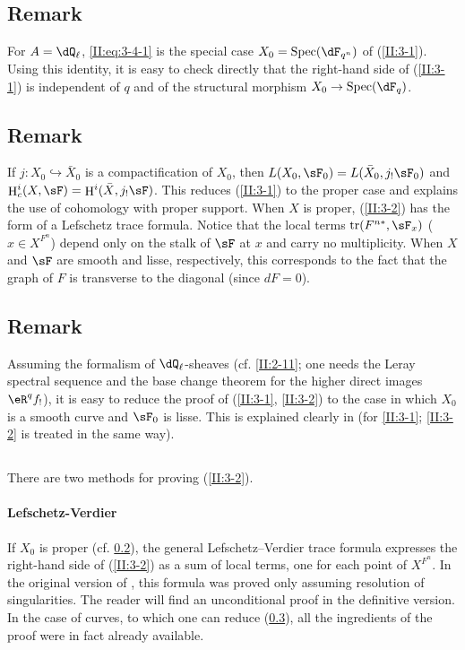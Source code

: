 \documentclass[12pt,oneside,english]{smfbook}
\DeclareMathOperator{\h}{H}
\DeclareMathOperator{\spec}{Spec}
\DeclareMathOperator{\tr}{tr}
\begin{document}
\subsection{Remark}\label{II:3-5}

For $A=\dQ_\ell$, \eqref{II:eq:3-4-1} is the special case $X_0=\spec(\dF_{q^n})$ of (\ref{II:3-1}). Using this identity, it is easy to check directly that the right-hand side of (\ref{II:3-1}) is independent of $q$ and of the structural morphism $X_0\to\spec(\dF_q)$.

\subsection{Remark}\label{II:3-6}

If $j:X_0\hookrightarrow\bar X_0$ is a compactification of $X_0$, then $L(X_0,\sF_0)=L(\bar X_0,j_!\sF_0)$ and $\h_c^i(X,\sF)=\h^i(\bar X,j_!\sF)$. This reduces (\ref{II:3-1}) to the proper case and explains the use of cohomology with proper support. When $X$ is proper, (\ref{II:3-2}) has the form of a Lefschetz trace formula. Notice that the local terms $\tr(F^{n*},\sF_x)$ ($x\in X^{F^n}$) depend only on the stalk of $\sF$ at $x$ and carry no multiplicity. When $X$ and $\sF$ are smooth and lisse, respectively, this corresponds to the fact that the graph of $F$ is transverse to the diagonal (since $dF=0$).

\subsection{Remark}\label{II:3-7}

Assuming the formalism of $\dQ_\ell$-sheaves (cf. \ref{II:2-11}; one needs the Leray spectral sequence and the base change theorem for the higher direct images $\eR^qf_!$), it is easy to reduce the proof of (\ref{II:3-1}, \ref{II:3-2}) to the case in which $X_0$ is a smooth curve and $\sF_0$ is lisse. This is explained clearly in \cite[\S 5]{gr95} (for \ref{II:3-1}; \ref{II:3-2} is treated in the same way).

\subsection{}\label{II:3-8}

There are two methods for proving (\ref{II:3-2}).

\paragraph{Lefschetz-Verdier}
If $X_0$ is proper (cf. \ref{II:3-6}), the general Lefschetz--Verdier trace formula expresses the right-hand side of (\ref{II:3-2}) as a sum of local terms, one for each point of $X^{F^n}$. In the original version of \cite{sga5}, this formula was proved only assuming resolution of singularities. The reader will find an unconditional proof in the definitive version. In the case of curves, to which one can reduce (\ref{II:3-7}), all the ingredients of the proof were in fact already available.
\end{document}
